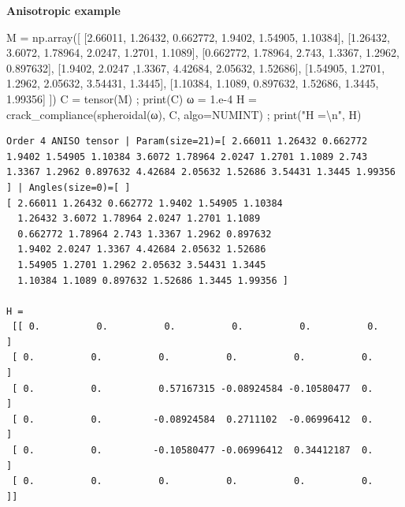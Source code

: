 \documentclass[
  letterpaper,
  DIV=11,
  numbers=noendperiod]{scrreprt}
\newenvironment{Shaded}{\begin{snugshade}}{\end{snugshade}}
\newcommand{\BuiltInTok}[1]{\textcolor[rgb]{0.00,0.23,0.31}{#1}}
\newcommand{\CharTok}[1]{\textcolor[rgb]{0.13,0.47,0.30}{#1}}
\newcommand{\FloatTok}[1]{\textcolor[rgb]{0.68,0.00,0.00}{#1}}
\newcommand{\NormalTok}[1]{\textcolor[rgb]{0.00,0.23,0.31}{#1}}
\newcommand{\OperatorTok}[1]{\textcolor[rgb]{0.37,0.37,0.37}{#1}}
\newcommand{\StringTok}[1]{\textcolor[rgb]{0.13,0.47,0.30}{#1}}
\begin{document}
\textbf{Anisotropic example}

\begin{Shaded}
\begin{Highlighting}[]
\NormalTok{M }\OperatorTok{=}\NormalTok{ np.array([ [}\FloatTok{2.66011}\NormalTok{, }\FloatTok{1.26432}\NormalTok{, }\FloatTok{0.662772}\NormalTok{, }\FloatTok{1.9402}\NormalTok{, }\FloatTok{1.54905}\NormalTok{, }\FloatTok{1.10384}\NormalTok{],}
\NormalTok{               [}\FloatTok{1.26432}\NormalTok{, }\FloatTok{3.6072}\NormalTok{, }\FloatTok{1.78964}\NormalTok{, }\FloatTok{2.0247}\NormalTok{, }\FloatTok{1.2701}\NormalTok{, }\FloatTok{1.1089}\NormalTok{], }
\NormalTok{               [}\FloatTok{0.662772}\NormalTok{, }\FloatTok{1.78964}\NormalTok{, }\FloatTok{2.743}\NormalTok{, }\FloatTok{1.3367}\NormalTok{, }\FloatTok{1.2962}\NormalTok{, }\FloatTok{0.897632}\NormalTok{], }
\NormalTok{               [}\FloatTok{1.9402}\NormalTok{, }\FloatTok{2.0247}\NormalTok{ ,}\FloatTok{1.3367}\NormalTok{, }\FloatTok{4.42684}\NormalTok{, }\FloatTok{2.05632}\NormalTok{, }\FloatTok{1.52686}\NormalTok{], }
\NormalTok{               [}\FloatTok{1.54905}\NormalTok{, }\FloatTok{1.2701}\NormalTok{, }\FloatTok{1.2962}\NormalTok{, }\FloatTok{2.05632}\NormalTok{, }\FloatTok{3.54431}\NormalTok{, }\FloatTok{1.3445}\NormalTok{], }
\NormalTok{               [}\FloatTok{1.10384}\NormalTok{, }\FloatTok{1.1089}\NormalTok{, }\FloatTok{0.897632}\NormalTok{, }\FloatTok{1.52686}\NormalTok{, }\FloatTok{1.3445}\NormalTok{, }\FloatTok{1.99356}\NormalTok{] ])}
\NormalTok{C }\OperatorTok{=}\NormalTok{ tensor(M) }\OperatorTok{;} \BuiltInTok{print}\NormalTok{(C)}
\NormalTok{ω }\OperatorTok{=} \FloatTok{1.e{-}4}
\NormalTok{H }\OperatorTok{=}\NormalTok{ crack\_compliance(spheroidal(ω), C, algo}\OperatorTok{=}\NormalTok{NUMINT) }\OperatorTok{;} \BuiltInTok{print}\NormalTok{(}\StringTok{"H =}\CharTok{\textbackslash{}n}\StringTok{"}\NormalTok{, H)}
\end{Highlighting}
\end{Shaded}

\begin{verbatim}
Order 4 ANISO tensor | Param(size=21)=[ 2.66011 1.26432 0.662772 1.9402 1.54905 1.10384 3.6072 1.78964 2.0247 1.2701 1.1089 2.743 1.3367 1.2962 0.897632 4.42684 2.05632 1.52686 3.54431 1.3445 1.99356 ] | Angles(size=0)=[ ]
[ 2.66011 1.26432 0.662772 1.9402 1.54905 1.10384 
  1.26432 3.6072 1.78964 2.0247 1.2701 1.1089 
  0.662772 1.78964 2.743 1.3367 1.2962 0.897632 
  1.9402 2.0247 1.3367 4.42684 2.05632 1.52686 
  1.54905 1.2701 1.2962 2.05632 3.54431 1.3445 
  1.10384 1.1089 0.897632 1.52686 1.3445 1.99356 ]

H =
 [[ 0.          0.          0.          0.          0.          0.        ]
 [ 0.          0.          0.          0.          0.          0.        ]
 [ 0.          0.          0.57167315 -0.08924584 -0.10580477  0.        ]
 [ 0.          0.         -0.08924584  0.2711102  -0.06996412  0.        ]
 [ 0.          0.         -0.10580477 -0.06996412  0.34412187  0.        ]
 [ 0.          0.          0.          0.          0.          0.        ]]
\end{verbatim}
\end{document}
